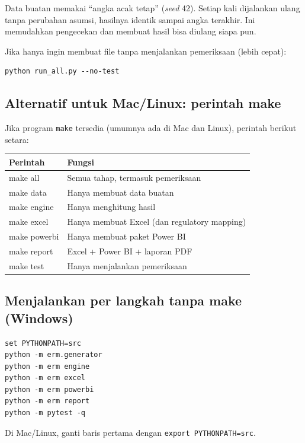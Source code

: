 \documentclass[11pt,a4paper]{article}
\begin{document}
\begin{infobox}
Data buatan memakai ``angka acak tetap'' (\emph{seed} 42). Setiap kali dijalankan ulang tanpa perubahan asumsi, hasilnya identik sampai angka terakhir. Ini memudahkan pengecekan dan membuat hasil bisa diulang siapa pun.
\end{infobox}

Jika hanya ingin membuat file tanpa menjalankan pemeriksaan (lebih cepat):
\begin{lstlisting}
python run_all.py --no-test
\end{lstlisting}

\subsection{Alternatif untuk Mac/Linux: perintah make}

Jika program \texttt{make} tersedia (umumnya ada di Mac dan Linux), perintah berikut setara:

\begin{center}
\begin{tabularx}{\linewidth}{>{\ttfamily}p{3.4cm}X}
\toprule
\textrm{\textbf{Perintah}} & \textbf{Fungsi} \\
\midrule
make all & Semua tahap, termasuk pemeriksaan \\
make data & Hanya membuat data buatan \\
make engine & Hanya menghitung hasil \\
make excel & Hanya membuat Excel (dan regulatory mapping) \\
make powerbi & Hanya membuat paket Power BI \\
make report & Excel + Power BI + laporan PDF \\
make test & Hanya menjalankan pemeriksaan \\
\bottomrule
\end{tabularx}
\end{center}

\subsection{Menjalankan per langkah tanpa make (Windows)}

\begin{lstlisting}
set PYTHONPATH=src
python -m erm.generator
python -m erm engine
python -m erm excel
python -m erm powerbi
python -m erm report
python -m pytest -q
\end{lstlisting}
Di Mac/Linux, ganti baris pertama dengan \texttt{export PYTHONPATH=src}.
\end{document}
